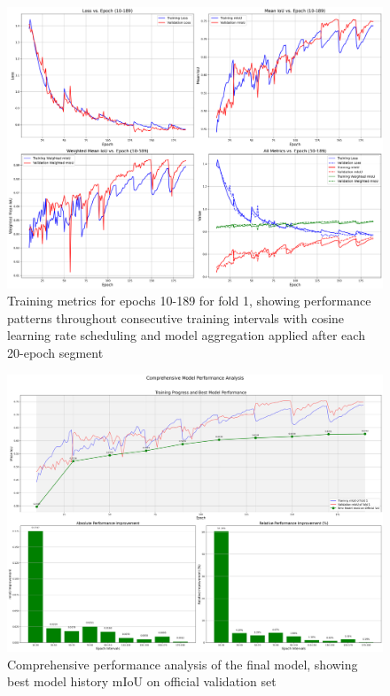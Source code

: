 \documentclass[]{article}
\begin{document}
\begin{figure}[htbp]
		\centering
		\includegraphics[width=1.0\textwidth]{../outputs/deeplabv3plus_test_results/combined_metrics_epochs_10_to_189.png}
		\caption{Training metrics for epochs 10-189 for fold 1, showing performance patterns throughout consecutive training intervals with cosine learning rate scheduling and model aggregation applied after each 20-epoch segment}
		\label{fig:train_metrics_10_189}
\end{figure}
\begin{figure}[htbp]
		\centering
		\includegraphics[width=1.0\textwidth]{../outputs/deeplabv3plus_test_results/comprehensive_performance_analysis.png}
		\caption{Comprehensive performance analysis of the final model, showing best model history mIoU on official validation set}
		\label{fig:comprehensive_performance_analysis}
\end{figure}
\end{document}

